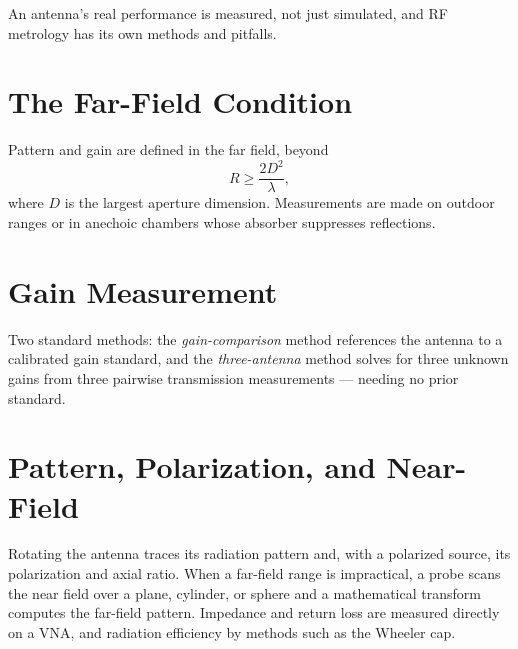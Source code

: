 An antenna's real performance is measured, not just simulated, and RF metrology
has its own methods and pitfalls.

\section{The Far-Field Condition}
Pattern and gain are defined in the far field, beyond
\[ R \ge \frac{2 D^2}{\lambda}, \]
where $D$ is the largest aperture dimension. Measurements are made on outdoor
ranges or in anechoic chambers whose absorber suppresses reflections.

\section{Gain Measurement}
Two standard methods: the \emph{gain-comparison} method references the antenna to
a calibrated gain standard, and the \emph{three-antenna} method solves for three
unknown gains from three pairwise transmission measurements --- needing no prior
standard.

\section{Pattern, Polarization, and Near-Field}
Rotating the antenna traces its radiation pattern and, with a polarized source,
its polarization and axial ratio. When a far-field range is impractical, a probe
scans the near field over a plane, cylinder, or sphere and a mathematical
transform computes the far-field pattern. Impedance and return loss are measured
directly on a VNA, and radiation efficiency by methods such as the Wheeler cap.

